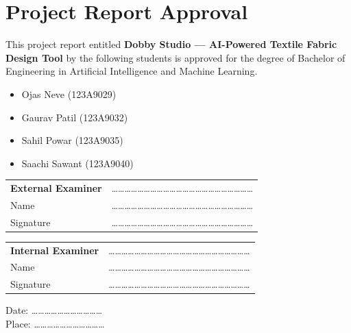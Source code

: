\chapter*{Project Report Approval}

\vspace{1cm}

This project report entitled \textbf{Dobby Studio — AI-Powered Textile Fabric Design Tool} by the following students is approved for the degree of Bachelor of Engineering in Artificial Intelligence and Machine Learning.

\begin{itemize}
    \item Ojas Neve (123A9029)
    \item Gaurav Patil (123A9032)
    \item Sahil Powar (123A9035)
    \item Saachi Sawant (123A9040)
\end{itemize}

\vspace{3cm}

\noindent
\begin{tabular}{ll}
\textbf{External Examiner} & ………………………………………………………… \\
Name & ………………………………………………………… \\
Signature & ………………………………………………………… \\
\end{tabular}

\vspace{2cm}

\noindent
\begin{tabular}{ll}
\textbf{Internal Examiner} & ………………………………………………………… \\
Name & ………………………………………………………… \\
Signature & ………………………………………………………… \\
\end{tabular}

\vspace{2cm}

\noindent Date: …………………………… \\
\noindent Place: ……………………………
